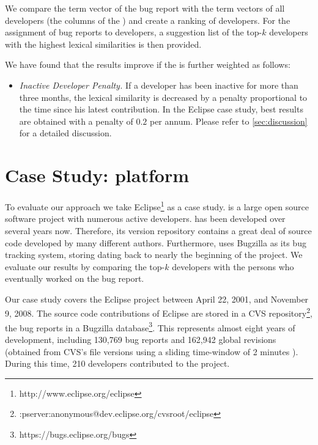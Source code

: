 We compare the term vector of the bug report with the term vectors of all developers (\ie the columns of the \TAM) and create a ranking of developers. For the assignment of bug reports to developers, a suggestion list of the top-$k$ developers with the highest lexical similarities is then provided.

We have found that the results improve if the \TAM is further weighted as follows:
\begin{itemize}
\item \emph{Inactive Developer Penalty.} If a developer has been inactive for more than three months, the lexical similarity is decreased by a penalty proportional to the time since his latest contribution. In the Eclipse case study, best results are obtained with a penalty of $0.2$ per annum. Please refer to \autoref{sec:discussion} for a detailed discussion.
\end{itemize}

\section{Case Study: \EC platform}\label{sec:casestudy}

To evaluate our approach we take Eclipse\footnote{http://www.eclipse.org/eclipse} as a case study. \EC is a large open source software project with numerous active developers.
\EC has been developed over several years now. Therefore, its version repository contains a great deal of source code developed by many different authors.
Furthermore, \EC uses Bugzilla as its bug tracking system, storing \BRs dating back to nearly the beginning of the project.
We evaluate our results by comparing the top-$k$ developers with the persons who eventually worked on the bug report.

Our case study covers the Eclipse project between April 22, 2001, and November 9, 2008. The source code contributions of Eclipse are stored in a CVS repository\footnote{:pserver:anonymous@dev.eclipse.org/cvsroot/eclipse}, the bug reports in a Bugzilla database\footnote{https://bugs.eclipse.org/bugs}. This represents almost eight years of development, including 130,769 bug reports and 162,942 global revisions (obtained from CVS's file versions using a sliding time-window of 2 minutes \cite{Zimm04a}). During this time, 210 developers contributed to the project.

